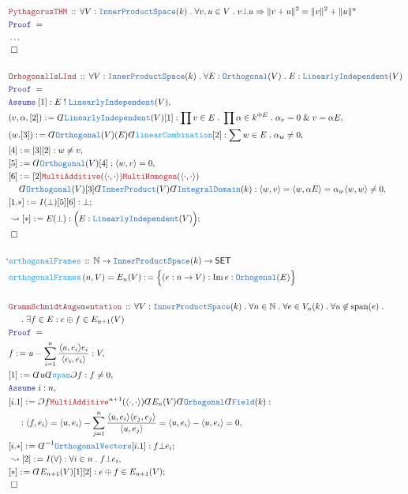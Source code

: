 \documentclass[12pt]{scrartcl}%
\newcommand{\TYPE}[1]{\textcolor{NavyBlue}{\mathtt{#1}}}%
\newcommand{\FUNC}[1]{\textcolor{Cerulean}{\mathtt{#1}}}%
\newcommand{\LOGIC}[1]{\textcolor{Blue}{\mathtt{#1}}}%
\newcommand{\THM}[1]{\textcolor{Maroon}{\mathtt{#1}}}%
\renewcommand{\.}{\; . \;} %
\newcommand{\de}{: \kern 0.1pc =} %
\newcommand{\IsNot}{\; ! \;} %
\newcommand{\Act}[1]{\left( #1 \right)} %
\newcommand{\Theorem}[2]{& \THM{#1} \, :: \, #2 \\ & \Proof = \\ } %
\newcommand{\DeclareFunc}[2]{& \FUNC{#1} \, :: \, #2 \\}%
\newcommand{\DefineNamedFunc}[4]{&  \FUNC{#1}\Act{#2} = #3 \de #4 \\}%
\newcommand{\NewLine}{\\ & \kern 1pc}%
\newcommand{\Page}[1]{ \begin{align*} #1 \end{align*}  }%
\newcommand{ \bd }{ \ByDef }%
\newcommand{\NoProof}{ & \ldots \\ \EndProof}%
\renewcommand{\And}{\; \& \;}%
\newcommand{\Nat}{\mathbb{N}}%
\DeclareMathOperator*{\im}{Im}%
\newcommand{\Say}[3]{& #1 \de #2 : #3, \\} %
\newcommand{\Conclude}[3]{& #1 \de #2 : #3; \\}%
\newcommand{\Derive}[3]{& \leadsto #1 \de #2 : #3, \\} %
\newcommand{\DeriveConclude}[3]{& \leadsto #1 \de #2 : #3 ; \\} %
\newcommand{\Assume}[2]{& \LOGIC{Assume} \; #1 : #2, \\} %
\newcommand{\QED}{\; \square} %
\newcommand{\EndProof}{& \QED \\} %
\newcommand{\ByDef}{\rotatebox[origin=c]{-180}{$D$}}%
\newcommand{\ByConstr}{\rotatebox[origin=c]{-180}{$C$}}%
\newcommand{\Proof}{\LOGIC{Proof} \; } %
\newcommand{\SET}{\mathsf{SET}} %
\newcommand{\LI}{\TYPE{LinearlyIndependent}}
\newcommand{\IPS}{\TYPE{InnerProductSpace}}
\DeclareMathOperator{\Span}{span} %
\newcommand{\Field}{\TYPE{Field}}
\newcommand{\ID}{\TYPE{IntegralDomain}}
\begin{document}
\Page{
	\Theorem{PythagorusTHM}{\forall V : \IPS(k) \. \forall v,u \in V \. v \bot u \Rightarrow \| v  + u \|^2 = \|v\|^2 + \|u\|^u}
	\NoProof
	\\
	\Theorem{OrhogonalIsLInd}{\forall V : \IPS(k) \. \forall E : \TYPE{Orthogonal}(V) \. E : \LI(V)}
	\Assume{[1]}{E \IsNot \LI(V)}
	\Say{(v,\alpha,[2])}{\bd \LI(V)[1]}{ \prod v \in E \. \prod \alpha \in k^{\oplus E} \. \alpha_v = 0 \And v = \alpha E }
	\Say{(w.[3])}{\bd \TYPE{Orthogonal}(V)(E)\bd \FUNC{linearCombination}[2]}{\sum w \in E \. \alpha_w \neq 0}
	\Say{[4]}{[3][2]}{w \neq v}
	\Say{[5]}{\bd \TYPE{Orthogonal}(V)[4]}{ \langle w,v \rangle = 0 }
	\Say{[6]}{
		[2]\THM{MultiAdditive}(\langle\cdot,\cdot\rangle)\THM{MultiHomogen}(\langle \cdot,\cdot \rangle)
		\NewLine \bd \TYPE{Orthogonal}(V)[3]\bd \TYPE{InnerProduct}(V)\bd \ID(k)
	}{ \langle w,v\rangle = \langle w, \alpha E \rangle = \alpha_w\langle w,w \rangle \neq 0 }
	\Conclude{[1.*]}{I(\bot)[5][6]}{\bot}
	\DeriveConclude{[*]}{E(\bot)}{\Big(E : \LI(V)\Big)}
	\EndProof
	\\`
	\DeclareFunc{orthogonalFrames}{ \Nat \to \IPS(k) \to \SET }
	\DefineNamedFunc{orthogonalFrames}{n,V}{E_n(V)}{ \Big\{ (e : n \to V) : \im e : \TYPE{Orhogonal}(E)   \Big\}  } 
	\\
	\Theorem{GrammSchmidtAugementation}{ 
		\forall V : \IPS(k) \. 
		\forall n \in \Nat \. 
		\forall e \in V_n(k) \.  
		\forall u \not \in \Span(e) \. \NewLine \.  
		\exists f \in E : e \oplus f \in E_{n+1}(V)
	}
	\Say{f}{ u - \sum^n_{i=1} \frac{\langle u,e_i \rangle e_i}{\langle e_i, e_i \rangle}}{V}
	\Say{[1]}{\bd u \bd \FUNC{span}\ByConstr f}{ f \neq 0}
	\Assume{i}{n}
	\Say{[i.1]}{ \ByConstr f \THM{MultiAdditive}^{n+1}(\langle \cdot, \cdot \rangle)\bd E_n(V)\bd \TYPE{Orhogonal} \bd \Field(k)}
	{
		\NewLine : 
		\langle f, e_i \rangle = 
		\langle u, e_i \rangle - \sum^n_{j=1}  \frac{\langle u, e_i  \rangle\langle e_j, e_j \rangle}{\langle u,e_j \rangle} =
		\langle u, e_i \rangle - \langle u, e_i \rangle = 
		0
	}
	\Conclude{[i.*]}{\bd^{-1} \TYPE{OrthogonalVectors}[i.1]}{f \bot e_i}
	\Derive{[2]}{I(\forall)}{\forall i \in n \. f \bot e_i}
	\Conclude{[*]}{\bd E_{n+1}(V)[1][2]}{ e \oplus f \in E_{n+1}(V)}
	\EndProof
}
\end{document}
